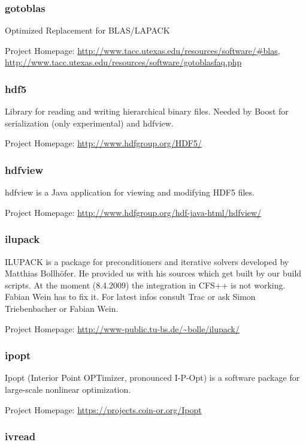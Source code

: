 \subsubsection{gotoblas} Optimized Replacement for BLAS/LAPACK

\noindent                           Project                          Homepage:
\url{http://www.tacc.utexas.edu/resources/software/#blas},
\url{http://www.tacc.utexas.edu/resources/software/gotoblasfaq.php}

\subsubsection{hdf5}  Library  for  reading  and writing  hierarchical  binary
files. Needed by Boost for serialization (only experimental) and hdfview.

\noindent Project Homepage: \url{http://www.hdfgroup.org/HDF5/}

\subsubsection{hdfview}
hdfview is a Java application for viewing and modifying HDF5 files.

\noindent Project Homepage: \url{http://www.hdfgroup.org/hdf-java-html/hdfview/}

\subsubsection{ilupack} ILUPACK is a package for preconditioners and iterative
solvers developed by Matthias Bollhöfer. He provided us with his sources which
get built by  our build scripts.  At the moment  (8.4.2009) the integration in
CFS++ is not working. Fabian Wein has to fix it. For latest infos consult Trac
or ask Simon Triebenbacher or Fabian Wein.

\noindent Project Homepage: \url{http://www-public.tu-bs.de/~bolle/ilupack/}

\subsubsection{ipopt}
Ipopt (Interior  Point OPTimizer, pronounced I-P-Opt) is  a software package
for large-scale nonlinear optimization.

\noindent Project Homepage: \url{https://projects.coin-or.org/Ipopt}

\subsubsection{ivread}

